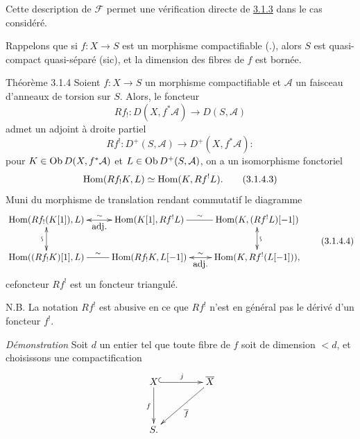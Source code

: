 \documentclass[10pt]{../fichiers-configuration-latex/smfart}
\begin{document}
Cette description de $ℱ$ permet une vérification directe de
\hyperref[XVIII.lem3.1.3]{3.1.3} dans le cas considéré.

Rappelons que si $f:X\rightarrow S$ est un morphisme compactifiable
(.), alors $S$ est quasi-compact quasi-séparé (sic), et la
dimension des fibres de $f$ est bornée.

\begin{enonce*}{Théorème 3.1.4}
Soient $f:X\rightarrow S$ un morphisme compactifiable et $\mathcal{A}$
un faisceau d'anneaux de torsion sur $S$. Alors, le foncteur
\begin{equation*}
Rf_{!}:D(X,f^{\ast}\mathcal{A})\longrightarrow D(S,\mathcal{A})\tag{3.1.4.1}
\end{equation*}%
admet un adjoint à droite partiel
\begin{equation*}
Rf^{!}:D^{+}(S,\mathcal{A})\longrightarrow D^{+}(X,f^{\ast}\mathcal{A}):\tag{3.1.4.2}
\end{equation*}%
pour $K\in \operatorname{Ob} D(X,f^{\ast}\mathcal{A})$ et $L\in \operatorname{Ob}
D^{+}(S,\mathcal{A})$, on a un isomorphisme fonctoriel 
\begin{equation*}
\operatorname{Hom}(Rf_{!}K,L)\simeq \operatorname{Hom}(K,Rf^{!}L){}.\tag{3.1.4.3}
\end{equation*}%
Muni du morphisme de translation rendant commutatif le diagramme 
\begin{equation*}
\vcenter{
\xymatrix{
  \Hom(Rf_!(K[1]),L)
  \ar@{<->}[d]_{\text{\rotatebox{90}{$\backsim$}}}\ar@{<->}[r]^-{\sim}_-{\txt{\rm adj.}}&
  \Hom(K[1],Rf^{!}L)\ar@{-}[r]^-\sim&
\Hom(K,(Rf^{!}L)[-1])\ar@{<->}[d]^{\text{\rotatebox{90}{$\backsim$}}}\\
\Hom((Rf_!K)[1],L)\ar@{-}[r]^-\sim & \Hom(Rf_!K,L[-1])
\ar@{<->}[r]^-{\sim}_-{\txt{\rm adj.}} & \Hom(K,Rf^{!}(L[-1])),
}}\tag{3.1.4.4}
\end{equation*}%
ce\pageoriginale foncteur $Rf^{!}$ est un foncteur triangulé.
\end{enonce*}

N.B. La notation $Rf^{!}$ est abusive en ce que $Rf^{!}$ n'est en
général pas le dérivé d'un foncteur $f^{!}$.

\noindent
\emph{Démonstration} Soit $d$ un entier tel que toute fibre de $f$
soit de dimension $<d$, et choisissons une compactification
$$
\xymatrix@R=1.25cm@C=1.5cm{
X \ar@{^{(}->}[r]^{j} \ar[d]_{f}& \bar{X}\ar[ld]^{\bar{f}}\\
S.
}
$$
\end{document}

